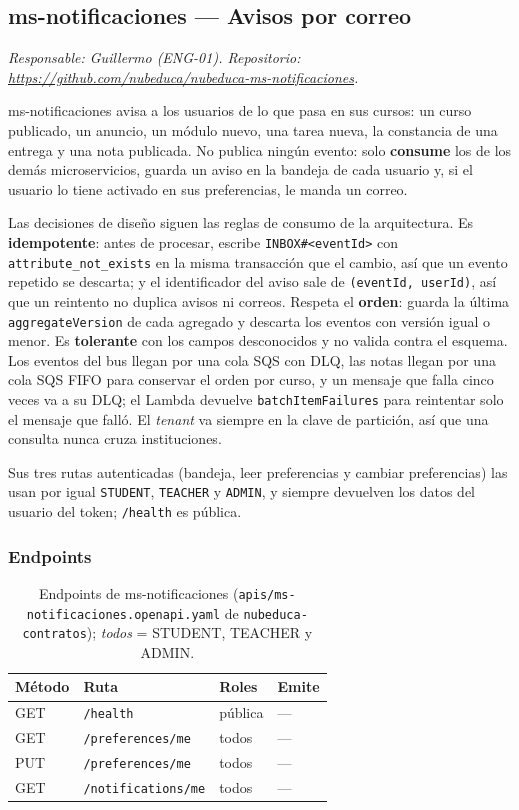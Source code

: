 \subsection{ms-notificaciones --- Avisos por correo}
\label{sec:ms-notificaciones}
\textit{Responsable: Guillermo (ENG-01). Repositorio: \url{https://github.com/nubeduca/nubeduca-ms-notificaciones}.}

ms-notificaciones avisa a los usuarios de lo que pasa en sus cursos: un curso publicado, un anuncio, un
módulo nuevo, una tarea nueva, la constancia de una entrega y una nota publicada. No publica ningún
evento: solo \textbf{consume} los de los demás microservicios, guarda un aviso en la bandeja de cada
usuario y, si el usuario lo tiene activado en sus preferencias, le manda un correo.

Las decisiones de diseño siguen las reglas de consumo de la arquitectura. Es \textbf{idempotente}: antes
de procesar, escribe \texttt{INBOX\#<eventId>} con \texttt{attribute\_not\_exists} en la misma transacción
que el cambio, así que un evento repetido se descarta; y el identificador del aviso sale de
\texttt{(eventId, userId)}, así que un reintento no duplica avisos ni correos. Respeta el \textbf{orden}:
guarda la última \texttt{aggregateVersion} de cada agregado y descarta los eventos con versión igual o
menor. Es \textbf{tolerante} con los campos desconocidos y no valida contra el esquema. Los eventos del
bus llegan por una cola SQS con DLQ, las notas llegan por una cola SQS FIFO para conservar el orden por
curso, y un mensaje que falla cinco veces va a su DLQ; el Lambda devuelve
\texttt{batchItemFailures} para reintentar solo el mensaje que falló. El \textit{tenant} va siempre en la
clave de partición, así que una consulta nunca cruza instituciones.

Sus tres rutas autenticadas (bandeja, leer preferencias y cambiar preferencias) las usan por igual
\texttt{STUDENT}, \texttt{TEACHER} y \texttt{ADMIN}, y siempre devuelven los datos del usuario del token;
\texttt{/health} es pública.

\subsubsection{Endpoints}
\begin{table}[htbp]
\centering\footnotesize
\begin{tabularx}{\textwidth}{lXll}
\toprule
Método & Ruta & Roles & Emite \\
\midrule
GET    & \texttt{/health} & pública & --- \\
GET    & \texttt{/preferences/me} & todos & --- \\
PUT    & \texttt{/preferences/me} & todos & --- \\
GET    & \texttt{/notifications/me} & todos & --- \\
\bottomrule
\end{tabularx}
\caption{Endpoints de ms-notificaciones (\texttt{apis/ms-notificaciones.openapi.yaml} de \texttt{nubeduca-contratos}); \textit{todos} = STUDENT, TEACHER y ADMIN.}
\end{table}

